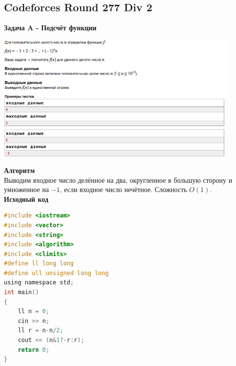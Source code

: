 \documentclass[a4paper,12pt]{article}
\begin{document}
%
%

\newpage
\subsection{Codeforces Round 277 Div 2}

\textbf{{\large Задача A - Подсчёт функции}} \\
\begin{center}
\includegraphics[width=0.9\textwidth]{C_277/C_277_A.png}\\ [1cm]
\end{center}
\textbf{{\large Алгоритм}} \\
Выводим входное число делённое на два, округленное в большую сторону и умноженное на $-1$, если входное число нечётное. Сложность $O(1)$. \\

\textbf{{\large Исходный код}}
\begin{lstlisting}[language=C]
#include <iostream>
#include <vector>
#include <string>
#include <algorithm>
#include <climits>
#define ll long long
#define ull unsigned long long
using namespace std;
int main()
{
    ll n = 0;
    cin >> n;
    ll r = n-n/2;
    cout << (n&1?-r:r);
    return 0;
}
\end{lstlisting}
\end{document}
